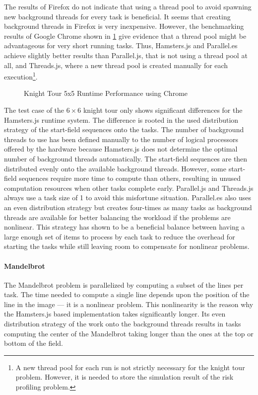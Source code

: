 The results of Firefox do not indicate that using a thread pool to avoid spawning new background threads for every task is beneficial. It seems that creating background threads in Firefox is very inexpensive. However, the benchmarking results of Google Chrome shown in \cref{fig:runtime-performance-chrome} give evidence that a thread pool might be advantageous for very short running tasks. Thus, Hamsters.js and Parallel.es achieve slightly better results than Parallel.js, that is not using a thread pool at all, and Threads.js, where a new thread pool is created manually for each execution\footnote{A new thread pool for each run is not strictly necessary for the knight tour problem. However, it is needed to store the simulation result of the risk profiling problem.}. 

\begin{figure}
	\centering
	
	\caption{Knight Tour 5x5 Runtime Performance using Chrome}
	\label{fig:runtime-performance-chrome}
\end{figure}

The test case of the $6\times6$ knight tour only shows significant differences for the Hamsters.js runtime system. The difference is rooted in the used distribution strategy of the start-field sequences onto the tasks. The number of background threads to use has been defined manually to the number of logical processors offered by the hardware because Hamsters.js does not determine the optimal number of background threads automatically. The start-field sequences are then distributed evenly onto the available background threads. However, some start-field sequences require more time to compute than others, resulting in unused computation resources when other tasks complete early. Parallel.js and Threads.js always use a task size of 1 to avoid this misfortune situation. Parallel.es also uses an even distribution strategy but creates four-times as many tasks as background threads are available for better balancing the workload if the problems are nonlinear. This strategy has shown to be a beneficial balance between having a large enough set of items to process by each task to reduce the overhead for starting the tasks while still leaving room to compensate for nonlinear problems. 

\paragraph{Mandelbrot}
The Mandelbrot problem is parallelized by computing a subset of the lines per task. The time needed to compute a single line depends upon the position of the line in the image --- it is a nonlinear problem. This nonlinearity is the reason why the Hamsters.js based implementation takes significantly longer. Its even distribution strategy of the work onto the background threads results in tasks computing the center of the Mandelbrot taking longer than the ones at the top or bottom of the field. 

